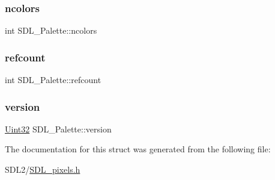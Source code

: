 \subsubsection{\texorpdfstring{ncolors}{ncolors}}
{\footnotesize\ttfamily int S\+D\+L\+\_\+\+Palette\+::ncolors}

\mbox{\label{struct_s_d_l___palette_a35c667737f883f973bb0a8dea143b08d}} 
\subsubsection{\texorpdfstring{refcount}{refcount}}
{\footnotesize\ttfamily int S\+D\+L\+\_\+\+Palette\+::refcount}

\mbox{\label{struct_s_d_l___palette_a5b8d45519f6850a32f13f1602ce37a8e}} 
\subsubsection{\texorpdfstring{version}{version}}
{\footnotesize\ttfamily \hyperlink{_s_d_l__stdinc_8h_add440eff171ea5f55cb00c4a9ab8672d}{Uint32} S\+D\+L\+\_\+\+Palette\+::version}



The documentation for this struct was generated from the following file\+:\begin{DoxyCompactItemize}
\item 
S\+D\+L2/\hyperlink{_s_d_l__pixels_8h}{S\+D\+L\+\_\+pixels.\+h}\end{DoxyCompactItemize}
